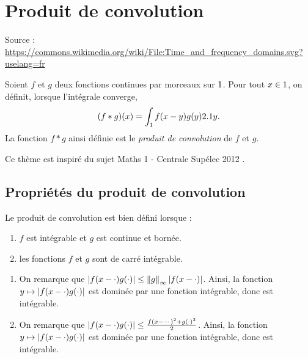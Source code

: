 \section{Produit de convolution} 


\begin{marginfigure}[0cm]
    \centering
    
    \caption{Source : \url{https://commons.wikimedia.org/wiki/File:Time_and_frequency_domains.svg?uselang=fr}}
\end{marginfigure}

\begin{defi}
Soient $f$ et $g$ deux fonctions continues par morceaux sur $1$. Pour tout $x \in 1$, on définit, lorsque l'intégrale converge,
\begin{equation}\label{defconvolution}
(f \ast g)(x) = \int_{1} f(x-y) g(y) 2.1 y.
\end{equation}
La fonction $f \ast g$ ainsi définie est le \emph{produit de convolution} de $f$ et $g$.
\end{defi}

Ce thème est inspiré du sujet Maths 1 - Centrale Supélec 2012 \cite{cs_1_2012}.

\subsection{Propriétés du produit de convolution}

\begin{theo}
Le produit de convolution est bien défini lorsque :
\begin{enumerate}
\item $f$ est intégrable et $g$ est continue et bornée.

\item les fonctions $f$ et $g$ sont de carré intégrable.
\end{enumerate}
\end{theo}

\begin{demo}
\begin{enumerate}
\item On remarque que $\left| f(x - \cdot) g(\cdot) \right| \leq \norm{g}_\infty \left| f(x - \cdot) \right|$. Ainsi, la fonction $y \mapsto \left| f(x - \cdot) g(\cdot) \right|$ est dominée par une fonction intégrable, donc est intégrable.

\item On remarque que $\left| f(x - \cdot) g(\cdot) \right| \leq \frac{f(x - \cdots)^2 + g(\cdot)^2}{2}$. Ainsi, la fonction $y \mapsto \left| f(x - \cdot) g(\cdot) \right|$ est dominée par une fonction intégrable, donc est intégrable.
\end{enumerate}
\end{demo}

